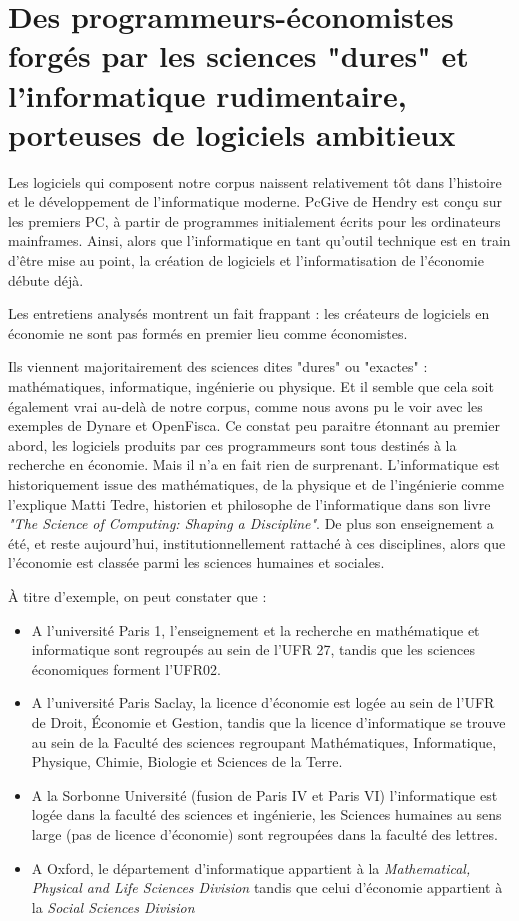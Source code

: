 \section{Des programmeurs-économistes forgés par les sciences "dures" et l’informatique rudimentaire, porteuses de logiciels ambitieux}

Les logiciels qui composent notre corpus naissent relativement tôt dans l'histoire et le développement de l'informatique moderne. PcGive de Hendry est conçu sur les premiers PC, à partir de programmes initialement écrits pour les ordinateurs mainframes. Ainsi, alors que l'informatique en tant qu'outil technique est en train d'être mise au point, la création de logiciels et l'informatisation de l'économie débute déjà.


Les entretiens analysés montrent un fait frappant : les créateurs de logiciels en économie ne sont pas formés en premier lieu comme économistes.

Ils viennent majoritairement des sciences dites "dures" ou "exactes" : mathématiques, informatique, ingénierie ou physique. Et il semble que cela soit également vrai au-delà de notre corpus, comme nous avons pu le voir avec les exemples de Dynare et OpenFisca.
Ce constat peu paraitre étonnant au premier abord, les logiciels produits par ces programmeurs sont tous destinés à la recherche en économie. Mais il n'a en fait rien de surprenant. L’informatique est historiquement issue des mathématiques, de la physique et de l’ingénierie comme l'explique Matti Tedre, historien et philosophe de l'informatique dans son livre \textit{"The Science of Computing: Shaping a Discipline"}\cite{tedreScienceComputingShaping2014}. De plus son enseignement a été, et reste aujourd’hui, institutionnellement rattaché à ces disciplines, alors que l’économie est classée parmi les sciences humaines et sociales.

À titre d'exemple, on peut constater que :
\begin{itemize}
  \item A l’université Paris 1, l’enseignement et la recherche en mathématique et informatique sont regroupés au sein de l’UFR 27, tandis que les sciences économiques forment l’UFR02.
  \item A l’université Paris Saclay, la licence d’économie est logée au sein de l’UFR de Droit, Économie et Gestion, tandis que la licence d’informatique se trouve au sein de la Faculté des sciences regroupant Mathématiques, Informatique, Physique, Chimie, Biologie et Sciences de la Terre.
  \item A la Sorbonne Université (fusion de Paris IV et Paris VI) l’informatique est logée dans la faculté des sciences et ingénierie, les Sciences humaines au sens large (pas de licence d’économie) sont regroupées dans la faculté des lettres.
  \item A Oxford, le département d'informatique appartient à la \textit{Mathematical, Physical and Life Sciences Division} tandis que celui d'économie appartient à la \textit{Social Sciences Division}
\end{itemize}

